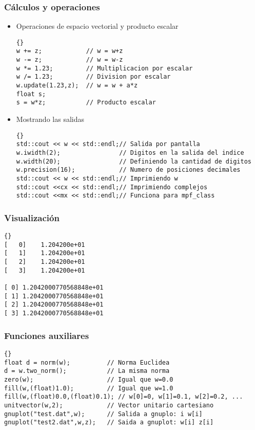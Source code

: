 \documentclass[a4paper,11pt]{article}
\theoremstyle{definition}
\begin{document}
\begin{frame}[fragile]
\frametitle{Cálculos y operaciones}
\begin{itemize}
\item Operaciones de espacio vectorial y producto escalar \\
{\footnotesize{\begin{lstlisting}{}
w += z;            // w = w+z
w -= z;            // w = w-z
w *= 1.23;         // Multiplicacion por escalar
w /= 1.23;         // Division por escalar
w.update(1.23,z);  // w = w + a*z
float s;
s = w*z;           // Producto escalar
\end{lstlisting}}}
\item Mostrando las salidas\\
{\footnotesize{\begin{lstlisting}{}
std::cout << w << std::endl;// Salida por pantalla
w.iwidth(2);                // Digitos en la salida del indice
w.width(20);                // Definiendo la cantidad de digitos
w.precision(16);            // Numero de posiciones decimales
std::cout << w << std::endl;// Imprimiendo w
std::cout <<cx << std::endl;// Imprimiendo complejos
std::cout <<mx << std::endl;// Funciona para mpf_class
\end{lstlisting}}}
\end{itemize}
\end{frame}

\begin{frame}[fragile]
\frametitle{Visualización}
{\footnotesize{\begin{lstlisting}{}
[   0]    1.204200e+01
[   1]    1.204200e+01
[   2]    1.204200e+01
[   3]    1.204200e+01

[ 0] 1.2042000770568848e+01
[ 1] 1.2042000770568848e+01
[ 2] 1.2042000770568848e+01
[ 3] 1.2042000770568848e+01
\end{lstlisting}}}
\end{frame}

\begin{frame}[fragile]
\frametitle{Funciones auxiliares}
{\footnotesize{\begin{lstlisting}{}
float d = norm(w);          // Norma Euclidea
d = w.two_norm();           // La misma norma
zero(w);                    // Igual que w=0.0
fill(w,(float)1.0);         // Igual que w=1.0
fill(w,(float)0.0,(float)0.1); // w[0]=0, w[1]=0.1, w[2]=0.2, ...
unitvector(w,2);            // Vector unitario cartesiano
gnuplot("test.dat",w);      // Salida a gnuplo: i w[i]
gnuplot("test2.dat",w,z);   // Saida a gnuplot: w[i] z[i]
\end{lstlisting}}}
\end{frame}
\end{document}
